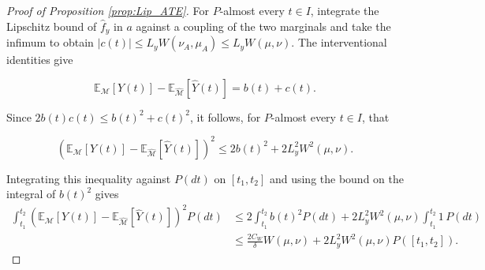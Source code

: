 \begin{proof}[Proof of Proposition \ref{prop:Lip_ATE}]
For $P$-almost every $t\in I$, integrate the Lipschitz bound of $\hat f_y$ in $a$ against a coupling of the two marginals and take the infimum to obtain $|c(t)|\leqslant L_yW(\nu_A,\mu_A)\leqslant L_yW(\mu,\nu)$. The interventional identities give

\[
\mathbb{E}_{\mathcal{M}}[Y(t)]-\mathbb{E}_{\hat{\mathcal{M}}}[\hat Y(t)]=b(t)+c(t).
\]

Since $2b(t)c(t)\leqslant b(t)^2+c(t)^2$, it follows, for $P$-almost every $t\in I$, that

\[
(\mathbb{E}_{\mathcal{M}}[Y(t)]-\mathbb{E}_{\hat{\mathcal{M}}}[\hat Y(t)])^2
\leqslant2b(t)^2+2L_y^2W^2(\mu,\nu).
\]

Integrating this inequality against $P(dt)$ on $[t_1,t_2]$ and using the bound on the integral of $b(t)^2$ gives
\begin{align*}
\int_{t_1}^{t_2}(\mathbb{E}_{\mathcal{M}}[Y(t)]-\mathbb{E}_{\hat{\mathcal{M}}}[\hat Y(t)])^2P(dt)
&\leqslant2\int_{t_1}^{t_2}b(t)^2P(dt)+2L_y^2W^2(\mu,\nu)\int_{t_1}^{t_2}1\,P(dt)\\
&\leqslant\frac{2C_W}{\delta}W(\mu,\nu)+2L_y^2W^2(\mu,\nu)P([t_1,t_2]).
\end{align*}
\end{proof}

